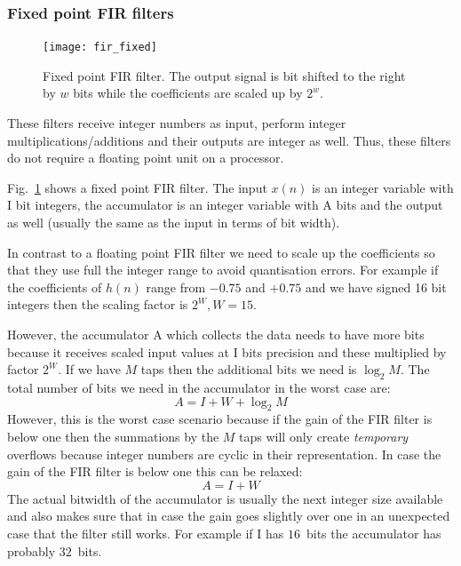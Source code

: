 \documentclass[12pt,a4paper]{article}
\begin{document}
\subsubsection{Fixed point FIR filters}
\begin{figure}[!hbt]
\begin{center}
\mbox{\texttt{[image: fir\_fixed]}}
\caption{Fixed point FIR filter. The output signal is bit shifted to the
  right by $w$ bits while the coefficients are scaled up by $2^w$. \label{fir_fixed}}
\end{center}
\end{figure}
These filters receive integer numbers as input, perform integer multiplications/additions
and their outputs are integer as well. Thus, these filters do not require
a floating point unit on a processor.

Fig.~\ref{fir_fixed} shows a fixed point FIR filter. The input $x(n)$ is an integer
variable with I bit integers, the accumulator is an integer variable with A bits and
the output as well (usually the same as the input in terms of bit width).

In contrast to a floating point FIR filter we need to scale up the
coefficients so that they use full the integer range to avoid
quantisation errors. For example if the coefficients of $h(n)$ range
from $-0.75$ and $+0.75$ and we have signed 16 bit integers then the
scaling factor is $2^W, W=15$.

However, the accumulator A which collects the data needs to have more
bits because it receives scaled input values at I bits precision and
these multiplied by factor $2^W$. If we have $M$ taps then the additional
bits we need is $\log_2 M$. The total number of bits we need in the accumulator
in the worst case are:
\begin{equation}
  A = I + W + \log_2 M
\end{equation}
However, this is the worst case scenario because if the gain of the
FIR filter is below one then the summations by the $M$ taps will only
create \textsl{temporary} overflows because integer numbers are
cyclic in their representation. In case the gain of the FIR filter
is below one this can be relaxed:
\begin{equation}
  A = I + W
\end{equation}
The actual bitwidth of the accumulator is usually the next integer size
available and also makes sure that in case the gain goes slightly over one
in an unexpected case that the filter still works. For example if I
has $16$~bits the accumulator has probably $32$~bits.
\end{document}
